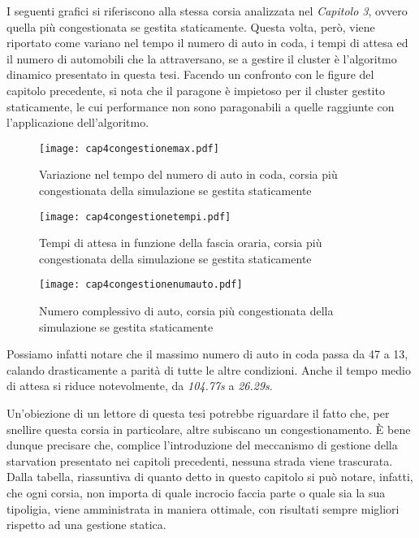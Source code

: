 \newpage
I seguenti grafici si riferiscono alla stessa corsia analizzata nel \textit{Capitolo 3}, ovvero quella più congestionata se gestita staticamente. Questa volta, però, viene riportato come variano nel tempo il numero di auto in coda, i tempi di attesa ed il numero di automobili che la attraversano, se a gestire il cluster è l'algoritmo dinamico presentato in questa tesi. Facendo un confronto con le figure del capitolo precedente, si nota che il paragone è impietoso per il cluster gestito staticamente, le cui performance non sono paragonabili a quelle raggiunte con l'applicazione dell'algoritmo.

\begin{figure}[H]
\centering
  \texttt{[image: cap4congestionemax.pdf]}
  \caption{Variazione nel tempo del numero di auto in coda, corsia più congestionata della simulazione se gestita staticamente}
  \label{fig:}
\end{figure}
\begin{figure}[H]
\centering
  \texttt{[image: cap4congestionetempi.pdf]}
  \caption{Tempi di attesa in funzione della fascia oraria, corsia più congestionata della simulazione se gestita staticamente}
  \label{fig:}
\end{figure}
\begin{figure}[H]
\centering
  \texttt{[image: cap4congestionenumauto.pdf]}
  \caption{Numero complessivo di auto, corsia più congestionata della simulazione se gestita staticamente}
  \label{fig:}
\end{figure}
\newpage
Possiamo infatti notare che il massimo numero di auto in coda passa da 47 a 13, calando drasticamente a parità di tutte le altre condizioni. Anche il tempo medio di attesa si riduce notevolmente, da \textit{104.77s} a \textit{26.29s}. 

Un'obiezione di un lettore di questa tesi potrebbe riguardare il fatto che, per snellire questa corsia in particolare, altre subiscano un congestionamento. È bene dunque precisare che, complice l'introduzione del meccanismo di gestione della starvation presentato nei capitoli precedenti, nessuna strada viene trascurata. Dalla tabella, riassuntiva di quanto detto in questo capitolo si può notare, infatti, che ogni corsia, non importa di quale incrocio faccia parte o quale sia la sua tipoligia, viene amministrata in maniera ottimale, con risultati sempre migliori rispetto ad una gestione statica.
\newline
















